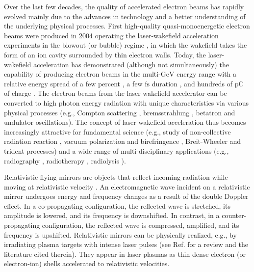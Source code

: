 \documentclass[10pt, a4paper, twoside, openright]{report}
\begin{document}
Over the last few decades, the quality of accelerated electron beams has rapidly evolved mainly due to the advances in technology and a better understanding of the underlying physical processes. First high-quality quasi-monoenergetic electron beams were produced in 2004 \cite{Faure2004, Geddes2004, Mangles2004} operating the laser-wakefield acceleration experiments in the blowout (or bubble) regime \cite{Pukhov2002, Lu2006, Lu2007}, in which the wakefield takes the form of an ion cavity surrounded by thin electron walls. Today, the laser-wakefield acceleration has demonstrated (although not simultaneously) the capability of producing electron beams in the multi-$ \mathrm{GeV} $ energy range with a relative energy spread of a few percent \cite{Karsch2007, Kim2013, Leemans2014, Gonsalves2019}, a few $ \mathrm{fs} $ duration \cite{Tilborg2006, Ohkubo2007, Debus2010, Lundh2011}, and hundreds of $ \mathrm{pC} $ of charge \cite{Couperus2017}. The electron beams from the laser-wakefield accelerator can be converted to high photon energy radiation with unique characteristics via various physical processes (e.g., Compton scattering \cite{Compton1923}, bremsstrahlung \cite{Bernstein1970}, betatron \cite{Whittum1990} and undulator \cite{Schwinger1949} oscillations). The concept of laser-wakefield acceleration thus becomes increasingly attractive for fundamental science (e.g., study of non-collective radiation reaction \cite{Zeldovich1975}, vacuum polarization and birefringence \cite{Dirac1934}, Breit-Wheeler \cite{Breit1934} and trident \cite{Ritus1972} processes) and a wide range of multi-disciplinary applications (e.g., radiography \cite{Glinec2005}, radiotherapy \cite{Malka2010, DesRosiers2000}, radiolysis \cite{Malka2010, Gauduel2010}).

Relativistic flying mirrors are objects that reflect incoming radiation while moving at relativistic velocity \cite{Einstein1905}. An electromagnetic wave incident on a relativistic mirror undergoes energy and frequency changes as a result of the double Doppler effect. In a co-propagating configuration, the reflected wave is stretched, its amplitude is lowered, and its frequency is downshifted. In contrast, in a counter-propagating configuration, the reflected wave is compressed, amplified, and its frequency is upshifted. Relativistic mirrors can be physically realized, e.g., by irradiating plasma targets with intense laser pulses (see Ref.  for a review and the literature cited therein). They appear in laser plasmas as thin dense electron (or electron-ion) shells accelerated to relativistic velocities.
\end{document}
